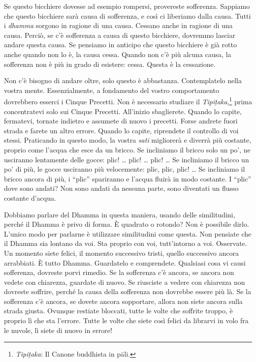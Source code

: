 Se questo bicchiere dovesse ad esempio rompersi, provereste sofferenza.
Sappiamo che questo bicchiere sarà causa di sofferenza, e così ci
liberiamo dalla causa. Tutti i \emph{dhamma} sorgono in ragione di una
causa. Cessano anche in ragione di una causa. Perciò, se c'è sofferenza
a causa di questo bicchiere, dovremmo lasciar andare questa causa. Se
pensiamo in anticipo che questo bicchiere è già rotto anche quando non
lo è, la causa cessa. Quando non c'è più alcuna causa, la sofferenza non
è più in grado di esistere: cessa. Questa è la cessazione.

Non c'è bisogno di andare oltre, solo questo è abbastanza. Contemplatelo
nella vostra mente. Essenzialmente, a fondamento del vostro
comportamento dovrebbero esserci i Cinque Precetti. Non è necessario
studiare il \emph{Tipiṭaka},\footnote{\emph{Tipiṭaka}: Il Canone
  buddhista in pāli.} prima concentratevi solo sui Cinque Precetti.
All'inizio sbaglierete. Quando lo capite, fermatevi, tornate indietro e
assumete di nuovo i precetti. Forse andrete fuori strada e farete un
altro errore. Quando lo capite, riprendete il controllo di voi stessi.
Praticando in questo modo, la vostra \emph{sati} migliorerà e diverrà
più costante, proprio come l'acqua che esce da un bricco. Se incliniamo
il bricco solo un po', ne usciranno lentamente delle gocce: plic! \ldots{}
plic! \ldots{} plic! \ldots{} Se incliniamo il bricco un po' di più, le gocce
usciranno più velocemente: plic, plic, plic! \ldots{} Se incliniamo il bricco
ancora di più, i ``plic'' spariranno e l'acqua fluirà in modo costante.
I ``plic'' dove sono andati? Non sono andati da nessuna parte, sono
diventati un flusso costante d'acqua.

Dobbiamo parlare del Dhamma in questa maniera, usando delle
similitudini, perché il Dhamma è privo di forma. È quadrato o rotondo?
Non è possibile dirlo. L'unico modo per parlarne è utilizzare
similitudini come questa. Non pensiate che il Dhamma sia lontano da voi.
Sta proprio con voi, tutt'intorno a voi. Osservate. Un momento siete
felici, il momento successivo tristi, quello successivo ancora
arrabbiati. È tutto Dhamma. Guardatelo e comprendete. Qualsiasi cosa vi
causi sofferenza, dovreste porvi rimedio. Se la sofferenza c'è ancora,
se ancora non vedete con chiarezza, guardate di nuovo. Se riusciste a
vedere con chiarezza non dovreste soffrire, perché la causa della
sofferenza non dovrebbe essere più là. Se la sofferenza c'è ancora, se
dovete ancora sopportare, allora non siete ancora sulla strada giusta.
Ovunque restiate bloccati, tutte le volte che soffrite troppo, è proprio
lì che sta l'errore. Tutte le volte che siete così felici da librarvi in
volo fra le nuvole, lì siete di nuovo in errore!

